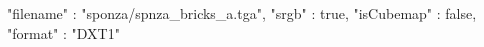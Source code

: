 { 
	"filename" : "sponza/spnza_bricks_a.tga", 
	"srgb" : true,
	"isCubemap" : false,
	"format" : "DXT1"
}